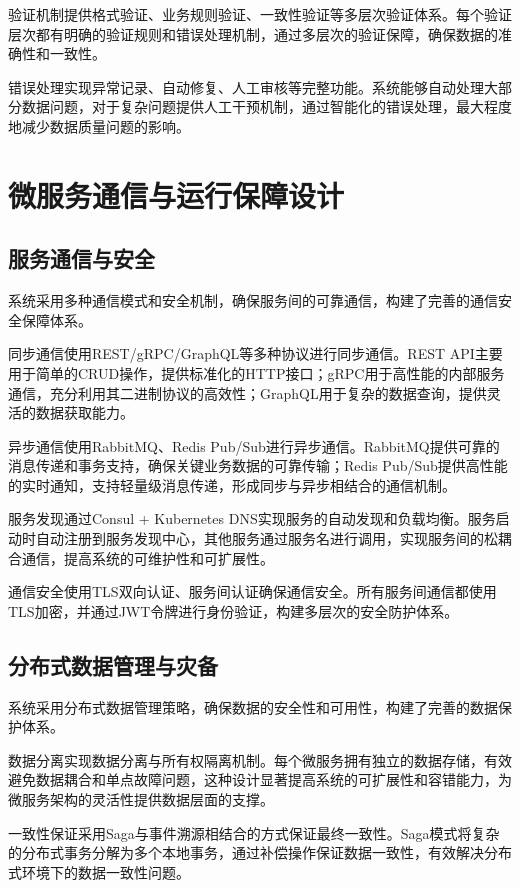 验证机制提供格式验证、业务规则验证、一致性验证等多层次验证体系。每个验证层次都有明确的验证规则和错误处理机制，通过多层次的验证保障，确保数据的准确性和一致性。

错误处理实现异常记录、自动修复、人工审核等完整功能。系统能够自动处理大部分数据问题，对于复杂问题提供人工干预机制，通过智能化的错误处理，最大程度地减少数据质量问题的影响。

\section{微服务通信与运行保障设计}

\subsection{服务通信与安全}

系统采用多种通信模式和安全机制，确保服务间的可靠通信，构建了完善的通信安全保障体系。

同步通信使用REST/gRPC/GraphQL等多种协议进行同步通信。REST API主要用于简单的CRUD操作，提供标准化的HTTP接口；gRPC用于高性能的内部服务通信，充分利用其二进制协议的高效性；GraphQL用于复杂的数据查询，提供灵活的数据获取能力。

异步通信使用RabbitMQ、Redis Pub/Sub进行异步通信。RabbitMQ提供可靠的消息传递和事务支持，确保关键业务数据的可靠传输；Redis Pub/Sub提供高性能的实时通知，支持轻量级消息传递，形成同步与异步相结合的通信机制。

服务发现通过Consul + Kubernetes DNS实现服务的自动发现和负载均衡。服务启动时自动注册到服务发现中心，其他服务通过服务名进行调用，实现服务间的松耦合通信，提高系统的可维护性和可扩展性。

通信安全使用TLS双向认证、服务间认证确保通信安全。所有服务间通信都使用TLS加密，并通过JWT令牌进行身份验证，构建多层次的安全防护体系。

\subsection{分布式数据管理与灾备}

系统采用分布式数据管理策略，确保数据的安全性和可用性，构建了完善的数据保护体系。

数据分离实现数据分离与所有权隔离机制。每个微服务拥有独立的数据存储，有效避免数据耦合和单点故障问题，这种设计显著提高系统的可扩展性和容错能力，为微服务架构的灵活性提供数据层面的支撑。

一致性保证采用Saga与事件溯源相结合的方式保证最终一致性。Saga模式将复杂的分布式事务分解为多个本地事务，通过补偿操作保证数据一致性，有效解决分布式环境下的数据一致性问题。

